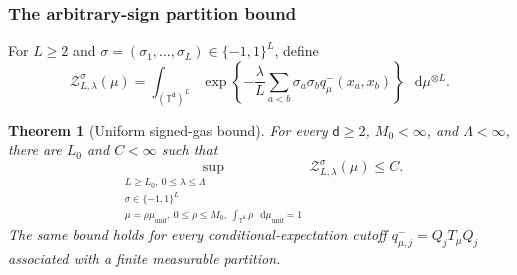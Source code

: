 \documentclass[11pt,reqno]{amsart}
\numberwithin{equation}{section}
\theoremstyle{plain}
\newtheorem{thm}{Theorem}[section]
\theoremstyle{definition}
\renewcommand{\d}{\mathsf d}
\newcommand{\dd}{\mathop{}\!\mathrm d}
\newcommand{\T}{\mathbb T}
\newcommand{\muunif}{\mu_{\mathrm{unif}}}
\begin{document}
\subsubsection{The arbitrary-sign partition bound}

For $L\ge2$ and $\sigma=(\sigma_1,\ldots,\sigma_L)\in\{-1,1\}^L$, define
\begin{equation}\label{rep:eq:signed-Z}
 \mathcal Z_{L,\lambda}^{\sigma}(\mu)
 =\int_{(\T^{\d})^L}\exp\left\{-\frac\lambda L
 \sum_{a<b}\sigma_a\sigma_bq^-_\mu(x_a,x_b)\right\}
 \,\dd\mu^{\otimes L}.
\end{equation}

\begin{thm}[Uniform signed-gas bound]\label{rep:thm:signed-bound}
For every $\d\ge2$, $M_0<\infty$, and $\Lambda<\infty$, there are $L_0$ and $C<\infty$ such that
\begin{equation}\label{rep:eq:signed-uniform}
 \sup_{\substack{L\ge L_0,\ 0\le\lambda\le\Lambda\\
 \sigma\in\{-1,1\}^L\\
 \mu=\rho\muunif,\ 0\le\rho\le M_0,\ \int_{\T^{\d}}\rho\,\dd\muunif=1}}
 \mathcal Z_{L,\lambda}^{\sigma}(\mu)\le C.
\end{equation}
The same bound holds for every conditional-expectation cutoff $q^-_{\mu,j}=Q_jT_\mu Q_j$ associated with a finite measurable partition.
\end{thm}
\end{document}
